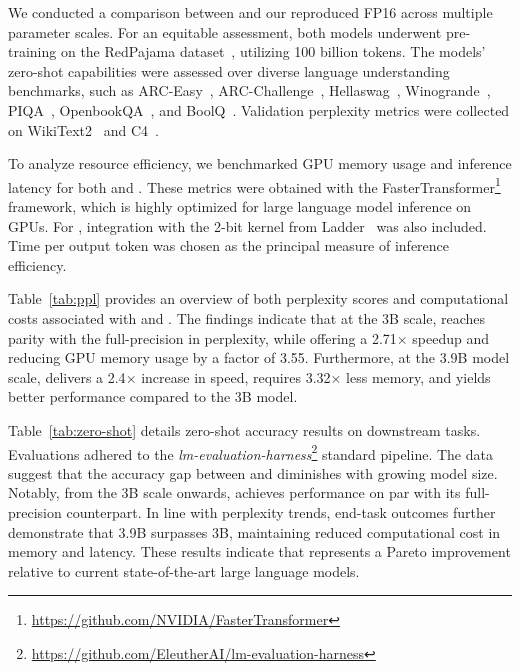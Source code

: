 We conducted a comparison between  and our reproduced FP16  across multiple parameter scales. For an equitable assessment, both models underwent pre-training on the RedPajama dataset~\cite{redpajama}, utilizing 100 billion tokens. The models' zero-shot capabilities were assessed over diverse language understanding benchmarks, such as ARC-Easy~\cite{arc}, ARC-Challenge~\cite{arc}, Hellaswag~\cite{hellaswag}, Winogrande~\cite{winoGrande}, PIQA~\cite{piqa}, OpenbookQA~\cite{openbookqa}, and BoolQ~\cite{boolq}. Validation perplexity metrics were collected on WikiText2~\cite{wikitext2} and C4~\cite{c4}.

To analyze resource efficiency, we benchmarked GPU memory usage and inference latency for both  and . These metrics were obtained with the FasterTransformer\footnote{\url{https://github.com/NVIDIA/FasterTransformer}} framework, which is highly optimized for large language model inference on GPUs. For , integration with the 2-bit kernel from Ladder~\cite{ladder} was also included. Time per output token was chosen as the principal measure of inference efficiency.

Table~\ref{tab:ppl} provides an overview of both perplexity scores and computational costs associated with  and . The findings indicate that at the 3B scale,  reaches parity with the full-precision  in perplexity, while offering a 2.71$\times$ speedup and reducing GPU memory usage by a factor of 3.55. Furthermore, at the 3.9B model scale,  delivers a 2.4$\times$ increase in speed, requires 3.32$\times$ less memory, and yields better performance compared to the  3B model.

Table~\ref{tab:zero-shot} details zero-shot accuracy results on downstream tasks. Evaluations adhered to the \emph{lm-evaluation-harness}\footnote{\url{https://github.com/EleutherAI/lm-evaluation-harness}} standard pipeline. The data suggest that the accuracy gap between  and  diminishes with growing model size. Notably, from the 3B scale onwards,  achieves performance on par with its full-precision counterpart. In line with perplexity trends, end-task outcomes further demonstrate that  3.9B surpasses  3B, maintaining reduced computational cost in memory and latency. These results indicate that  represents a Pareto improvement relative to current state-of-the-art large language models.

